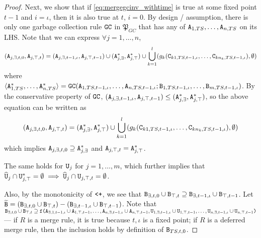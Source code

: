 \documentclass{article}
\numberwithin{equation}{section}
\renewcommand{\tt}[1]{\ifmmode\text{\texttt{#1}}\else\texttt{#1}\fi}
\begin{document}
\begin{proof}
Next, we show that if \eqref{eq:mergegcinv_withtime} is true at some fixed point $t-1$ and $i=\iota$, then it is also true at $t$, $i=0$.
By design / assumption, there is only one garbage collection rule $\tt{GC}$ in $\mathfrak{P}_{GC}$ that has any of $\tt{A}_{1,TS},\dots,\tt{A}_{n,TS}$ on its LHS.
Note that we can express $\forall j=1,\dots,n$,
\begin{align*}
(\tt{A}_{j,\exists,t,0}, \tt{A}_{j,\top,t})
= (\tt{A}_{j,\exists,t-1,\iota}, \tt{A}_{j,\top,t-1})
\cup (\tt{A}_{j,\exists}^*, \tt{A}_{j,\top}^*)
\cup \bigcup_{k=1}^l (g_k(\tt{C}_{k1,TS,t-1,\iota}, \dots, \tt{C}_{kn_k,TS,t-1,\iota}), \emptyset)
\end{align*}
where $\langle \tt{A}_{1,TS}^*, \dots, \tt{A}_{n,TS}^*\rangle = \tt{GC}(\tt{A}_{1,TS,t-1,\iota}, \dots, \tt{A}_{n,TS,t-1,\iota}; \tt{B}_{1,TS,t-1,\iota}, \dots, \tt{B}_{m,TS,t-1,\iota})$.
By the conservative property of $\tt{GC}$, $(\tt{A}_{j,\exists,t-1,\iota}, \tt{A}_{j,\top,t-1}) \leq (\tt{A}_{j,\exists}^*, \tt{A}_{j,\top}^*)$, so the above equation can be written as
\begin{align*}
(\tt{A}_{j,\exists,t,0}, \tt{A}_{j,\top,t})
= (\tt{A}_{j,\exists}^*, \tt{A}_{j,\top}^*)
\cup \bigcup_{k=1}^l (g_k(\tt{C}_{k1,TS,t-1,\iota}, \dots, \tt{C}_{kn_k,TS,t-1,\iota}), \emptyset)
\end{align*}
which implies $\tt{A}_{j,\exists,t,0} \supseteq \tt{A}_{j,\exists}^*$ and $\tt{A}_{j,\top,t} = \tt{A}_{j,\top}^*$.

The same holds for $\tt{U}_j$ for $j=1,\dots,m$, which further implies that $\widehat{\tt{U}}_j \cap \tt{U}_{j,\top}^* = \emptyset \implies \widehat{\tt{U}}_j \cap \tt{U}_{j,\top,t} = \emptyset$.

Also, by the monotonicity of $\tt{<+}$, we see that $\tt{B}_{\exists,t,0} \cup \tt{B}_{\top,t} \supseteq \tt{B}_{\exists,t-1,\iota} \cup \tt{B}_{\top,t-1}$.
Let $\widetilde{\tt{B}} = (\tt{B}_{\exists,t,0} \cup \tt{B}_{\top,t}) - (\tt{B}_{\exists,t-1,\iota} \cup \tt{B}_{\top,t-1})$.
Note that
$\tt{B}_{\exists,t,0} \cup \tt{B}_{\top,t} \supseteq \tt{f}\tt{(}\tt{A}_{\exists,1,t-1,\iota} \cup \tt{A}_{1,\top,t-1},\dots,\tt{A}_{n,\exists,t-1,\iota} \cup \tt{A}_{n,\top,t-1}, \tt{U}_{1,\exists,t-1,\iota} \cup \tt{U}_{1,\top,t-1},\dots,\tt{U}_{n,\exists,t-1,\iota} \cup \tt{U}_{n,\top,t-1}\tt{)}$ ---
if $R$ is a merge rule, it is true because $t,\iota$ is a fixed point;
if $R$ is a deferred merge rule, then the inclusion holds by definition of $\tt{B}_{TS,t,0}$.


\end{proof}
\end{document}
